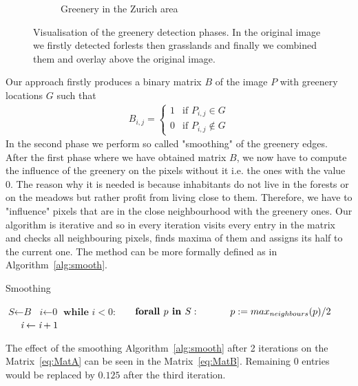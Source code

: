 \documentclass[letterpaper]{article}
\begin{document}
\begin{figure}[htb]
\begin{subfigure}[t]{.48\columnwidth}
        \caption[width=.9\linewidth]{Greenery in the Zurich area}
    \end{subfigure}
    \caption{Visualisation of the greenery detection phases. In the original image we firstly detected forlests then
             grasslands and finally we combined them and overlay above the original image.}
    \label{fig:ZurichGreenery}
\end{figure}

\indent Our approach firstly produces a binary matrix $B$ of the image $P$ with greenery locations $G$ such that
\newline
\begin{align*}
B_{i,j} = \begin{cases} 1 & \text{if } P_{i,j} \in G\\
                         0 & \text{if } P_{i,j} \notin G
\end{cases}
\end{align*}
\newline
In the second phase we perform so called "smoothing" of the greenery edges. After the first phase where we have obtained matrix $B$,
we now have to compute the influence of the greenery on the pixels without it i.e. the ones with the value 0. The reason why it is needed is
because inhabitants do not live in the forests or on the meadows but rather profit from living close to them. Therefore, we have
to "influence" pixels that are in the close neighbourhood with the greenery ones. Our algorithm is iterative and so in every iteration
visits every entry in the matrix and checks all neighbouring pixels, finds maxima of them and assigns its half to the current one.
The method can be more formally defined as in Algorithm~\ref{alg:smooth}.

\begin{algorithm}
    \caption{Smoothing}\label{alg:smooth}
    \begin{algorithmic}[1]
            \State $\textit{S} \gets \textit{B}$
            \State $\textit{i} \gets \textit{0}$
            \State $\textbf{while } \textit{i} < 0:$
            \State $\indent \textbf{forall } p \textbf{ in } S:$
            \State $\indent \indent p := max_{neighbours}(p) / 2$
            \State $\indent \textit{i} \gets \textit{i} + 1$
        \EndProcedure
    \end{algorithmic}
\end{algorithm}

The effect of the smoothing Algorithm~\ref{alg:smooth} after 2 iterations on the Matrix~\ref{eq:MatA}
can be seen in the Matrix~\ref{eq:MatB}. Remaining $0$ entries would be replaced by $0.125$ after
the third iteration.
\end{document}
